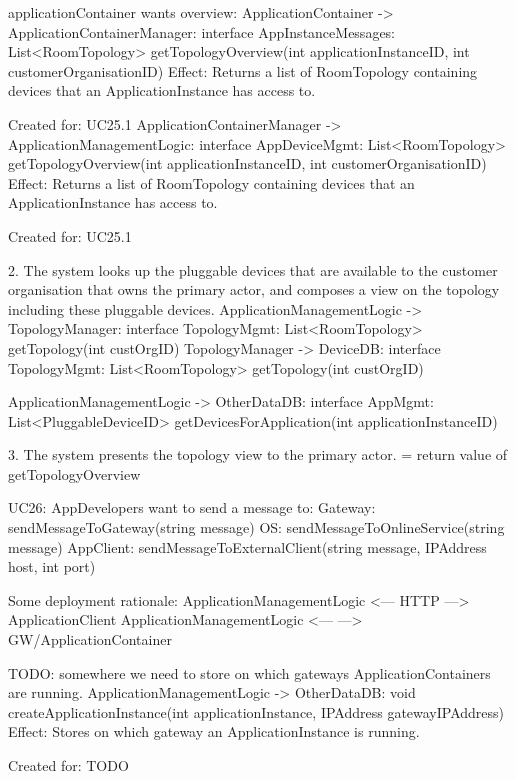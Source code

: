                 applicationContainer wants overview:
                    ApplicationContainer -> ApplicationContainerManager: interface AppInstanceMessages: List<RoomTopology> getTopologyOverview(int applicationInstanceID, int customerOrganisationID)
                        Effect: Returns a list of RoomTopology containing devices that an ApplicationInstance has access to.
                        \item Created for: UC25.1
                    ApplicationContainerManager -> ApplicationManagementLogic: interface AppDeviceMgmt: List<RoomTopology> getTopologyOverview(int applicationInstanceID, int customerOrganisationID)
                        Effect: Returns a list of RoomTopology containing devices that an ApplicationInstance has access to.
                        \item Created for: UC25.1

            2. The system looks up the pluggable devices that are available to the customer organisation that owns the primary actor,
               and composes a view on the topology including these pluggable devices.
                    ApplicationManagementLogic -> TopologyManager: interface TopologyMgmt: List<RoomTopology> getTopology(int custOrgID)
                    TopologyManager -> DeviceDB: interface TopologyMgmt: List<RoomTopology> getTopology(int custOrgID)

                    ApplicationManagementLogic -> OtherDataDB: interface AppMgmt: List<PluggableDeviceID> getDevicesForApplication(int applicationInstanceID)

            3. The system presents the topology view to the primary actor.
                    = return value of getTopologyOverview

        UC26:
            AppDevelopers want to send a message to:
                Gateway:   sendMessageToGateway(string message)
                OS:        sendMessageToOnlineService(string message)
                AppClient: sendMessageToExternalClient(string message, IPAddress host, int port)

           Some deployment rationale: ApplicationManagementLogic <--- HTTP ---> ApplicationClient
                                      ApplicationManagementLogic <---      ---> GW/ApplicationContainer

           TODO: somewhere we need to store on which gateways ApplicationContainers are running.
                ApplicationManagementLogic -> OtherDataDB: void createApplicationInstance(int applicationInstance, IPAddress gatewayIPAddress)
                    Effect: Stores on which gateway an ApplicationInstance is running.
                    \item Created for: TODO

